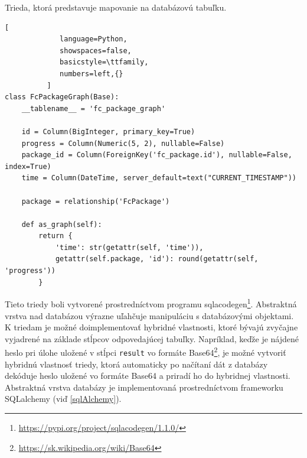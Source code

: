 \documentclass[slovak]{fitthesis}
\begin{document}
\begin{algorithm}
  \caption{Trieda, ktorá predstavuje mapovanie na databázovú tabuľku.}
  \label{abstractDBClass}
  \begin{lstlisting}[
             language=Python,
             showspaces=false,
             basicstyle=\ttfamily,
             numbers=left,{}
          ]
class FcPackageGraph(Base):
    __tablename__ = 'fc_package_graph'

    id = Column(BigInteger, primary_key=True)
    progress = Column(Numeric(5, 2), nullable=False)
    package_id = Column(ForeignKey('fc_package.id'), nullable=False, index=True)
    time = Column(DateTime, server_default=text("CURRENT_TIMESTAMP"))

    package = relationship('FcPackage')

    def as_graph(self):
        return {
            'time': str(getattr(self, 'time')),
            getattr(self.package, 'id'): round(getattr(self, 'progress'))
        }
  \end{lstlisting}
\end{algorithm}

Tieto triedy boli vytvorené prostredníctvom programu sqlacodegen\footnote{\url{https://pypi.org/project/sqlacodegen/1.1.0/}}. Abstraktná vrstva nad databázou výrazne uľahčuje manipuláciu s databázovými objektami. K triedam je možné doimplementovať hybridné vlastnosti, ktoré bývajú zvyčajne vyjadrené na základe stĺpcov odpovedajúcej tabuľky. Napríklad, keďže je nájdené heslo pri úlohe uložené v stĺpci \texttt{result} vo formáte Base64\footnote{\url{https://sk.wikipedia.org/wiki/Base64}}, je možné vytvoriť hybridnú vlastnosť triedy, ktorá automaticky po načítaní dát z databázy dekóduje heslo uložené vo formáte Base64 a priradí ho do hybridnej vlastnosti. Abstraktná vrstva databázy je implementovaná prostredníctvom frameworku SQLalchemy (viď \ref{sqlAlchemy}).
\end{document}
